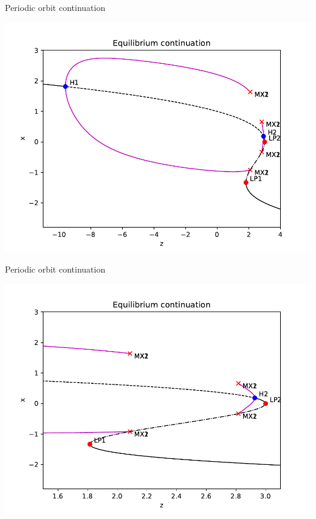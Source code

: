 \documentclass[presentation]{beamer}
\begin{document}
\begin{frame}[label={sec:org08b776b}]{Periodic orbit continuation}
\begin{center}
\includegraphics[height=.9\textheight]{./epc-2.pdf}
\end{center}
\end{frame}

\begin{frame}[label={sec:org0b7cd4a}]{Periodic orbit continuation}
\begin{center}
\includegraphics[height=.9\textheight]{./epc-2-2.pdf}
\end{center}
\end{frame}
\end{document}
